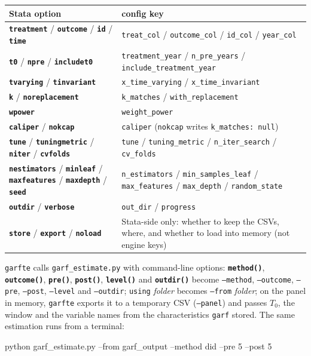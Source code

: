 \documentclass[11pt,a4paper]{article}
\newcommand{\opt}[1]{\texttt{\textbf{#1}}}
\newcommand{\code}[1]{\texttt{#1}}
\begin{document}
\begin{tabularx}{\textwidth}{@{}lX@{}}
\toprule
Stata option & config key\\
\midrule
\opt{treatment} / \opt{outcome} / \opt{id} / \opt{time} & \code{treat\_col} / \code{outcome\_col} / \code{id\_col} / \code{year\_col}\\
\opt{t0} / \opt{npre} / \opt{includet0} & \code{treatment\_year} / \code{n\_pre\_years} / \code{include\_treatment\_year}\\
\opt{tvarying} / \opt{tinvariant} & \code{x\_time\_varying} / \code{x\_time\_invariant}\\
\opt{k} / \opt{noreplacement} & \code{k\_matches} / \code{with\_replacement}\\
\opt{wpower} & \code{weight\_power}\\
\opt{caliper} / \opt{nokcap} & \code{caliper} \quad(\code{nokcap} writes \code{k\_matches: null})\\
\opt{tune} / \opt{tuningmetric} / \opt{niter} / \opt{cvfolds} & \code{tune} / \code{tuning\_metric} / \code{n\_iter\_search} / \code{cv\_folds}\\
\opt{nestimators} / \opt{minleaf} / \opt{maxfeatures} / \opt{maxdepth} / \opt{seed} & \code{n\_estimators} / \code{min\_samples\_leaf} / \code{max\_features} / \code{max\_depth} / \code{random\_state}\\
\opt{outdir} / \opt{verbose} & \code{out\_dir} / \code{progress}\\
\opt{store} / \opt{export} / \opt{noload} & Stata-side only: whether to keep the CSVs, where, and whether to load into memory (not engine keys)\\
\bottomrule
\end{tabularx}

\medskip
\code{garfte} calls \code{garf\_estimate.py} with command-line options: \opt{method()},
\opt{outcome()}, \opt{pre()}, \opt{post()}, \opt{level()} and \opt{outdir()} become
\code{--method}, \code{--outcome}, \code{--pre}, \code{--post}, \code{--level} and \code{--outdir};
\code{using} \emph{folder} becomes \code{--from} \emph{folder}; on the panel in memory, \code{garfte}
exports it to a temporary CSV (\code{--panel}) and passes $T_0$, the window and the variable names
from the characteristics \code{garf} stored. The same estimation runs from a terminal:
\begin{console}
python garf_estimate.py --from garf_output --method did --pre 5 --post 5
\end{console}

\end{document}
